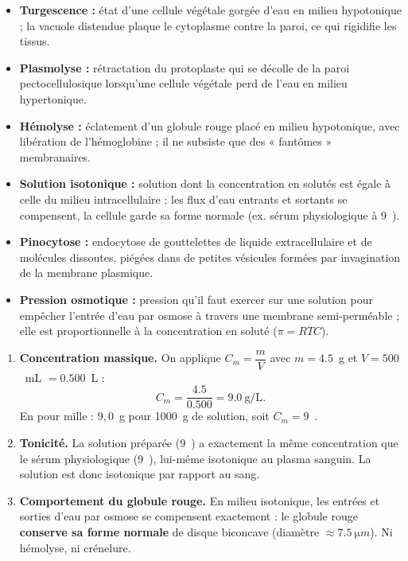 \documentclass[11pt]{article}
\newcommand{\cle}[1]{{\popxbold\color{popdark}#1}}
\begin{document}
\begin{corrige}
\begin{itemize}
\item \textbf{Turgescence :} état d'une cellule végétale gorgée d'eau en milieu hypotonique ; la vacuole distendue plaque le cytoplasme contre la paroi, ce qui rigidifie les tissus.
\item \textbf{Plasmolyse :} rétractation du protoplaste qui se décolle de la paroi pectocellulosique lorsqu'une cellule végétale perd de l'eau en milieu hypertonique.
\item \textbf{Hémolyse :} éclatement d'un globule rouge placé en milieu hypotonique, avec libération de l'hémoglobine ; il ne subsiste que des « fantômes » membranaires.
\item \textbf{Solution isotonique :} solution dont la concentration en solutés est égale à celle du milieu intracellulaire ; les flux d'eau entrants et sortants se compensent, la cellule garde sa forme normale (ex. sérum physiologique à 9~\textperthousand).
\item \textbf{Pinocytose :} endocytose de gouttelettes de liquide extracellulaire et de molécules dissoutes, piégées dans de petites vésicules formées par invagination de la membrane plasmique.
\item \textbf{Pression osmotique :} pression qu'il faut exercer sur une solution pour empêcher l'entrée d'eau par osmose à travers une membrane semi-perméable ; elle est proportionnelle à la concentration en soluté ($\pi = RTC$).
\end{itemize}
\end{corrige}

\begin{corrige}
\begin{enumerate}
\item \textbf{Concentration massique.} On applique $C_m = \dfrac{m}{V}$ avec $m = \num{4,5}$~g et $V = \num{500}$~mL $= \num{0,500}$~L :
\[ C_m = \frac{\num{4,5}}{\num{0,500}} = \num{9,0}~\text{g/L}. \]
En pour mille : $9,0$~g pour \num{1000}~g de solution, soit $C_m = 9$~\textperthousand.
\item \textbf{Tonicité.} La solution préparée (9~\textperthousand) a exactement la même concentration que le sérum physiologique (9~\textperthousand), lui-même isotonique au plasma sanguin. La solution est donc \cle{isotonique} par rapport au sang.
\item \textbf{Comportement du globule rouge.} En milieu isotonique, les entrées et sorties d'eau par osmose se compensent exactement : le globule rouge \textbf{conserve sa forme normale} de disque biconcave (diamètre $\approx \SI{7,5}{\micro m}$). Ni hémolyse, ni crénelure.
\end{enumerate}
\end{corrige}
\end{document}
